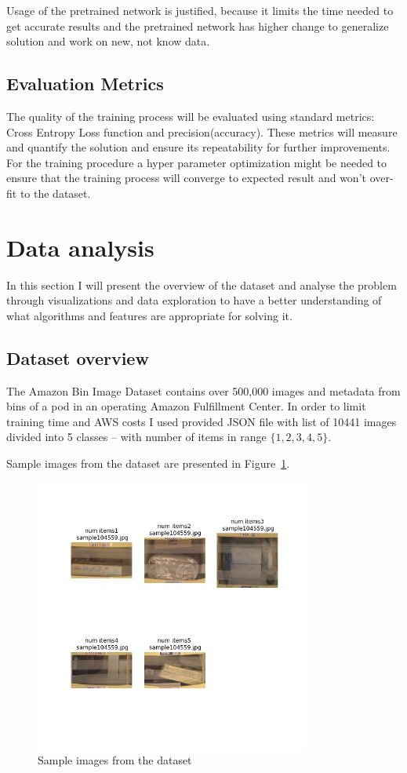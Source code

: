 \documentclass{article}
\begin{document}
Usage of the pretrained network is justified, because it limits the time needed to get accurate results and the pretrained network has higher change to generalize solution and work on new, not know data.

\subsection{Evaluation Metrics}
The quality of the training process will be evaluated using standard metrics: Cross Entropy Loss function and precision(accuracy). These metrics will measure and quantify the solution and ensure its repeatability for further improvements. For the training procedure a hyper parameter optimization might be needed to ensure that the training process will converge to expected result and won't over-fit to the dataset.

\section{Data analysis}
In this section I will present the overview of the dataset and analyse the problem through visualizations and data exploration to have a better understanding of what algorithms and features are appropriate for solving it.

\subsection{Dataset overview}
The Amazon Bin Image Dataset contains over 500,000 images and metadata from bins of a pod in an operating Amazon Fulfillment Center. In order to limit training time and AWS costs I used provided JSON file with list of 10441 images divided into 5 classes -- with number of items in range $\{1,2,3,4,5\}$.

Sample images from the dataset are presented in Figure~\ref{fig:samples}.
\begin{figure}[ht]
	\centering
	\includegraphics[height=90mm]{../project/sample_dataset_images.png}
	\caption{Sample images from the dataset}
	\label{fig:samples}
\end{figure}
\end{document}

